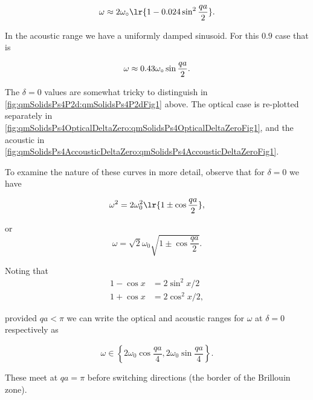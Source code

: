 {\begin{dmath}\label{eqn:condensedMatterProblemSet4Problem2:800}
\omega \approx 
2 \omega_\nought \lr{ 1 - 0.024 \sin^2 \frac{qa}{2} }.
\end{dmath}

In the acoustic  range we have a uniformly damped sinusoid.  For this $0.9$ case that is

\begin{dmath}\label{eqn:condensedMatterProblemSet4Problem2:720}
\omega \approx 0.43 \omega_\nought \sin \frac{qa}{2}.
\end{dmath}


The $\delta = 0$ values are somewhat tricky to distinguish in \cref{fig:qmSolidsPs4P2d:qmSolidsPs4P2dFig1} above.  The optical case is re-plotted separately in \cref{fig:qmSolidsPs4OpticalDeltaZero:qmSolidsPs4OpticalDeltaZeroFig1}, and the acoustic in \cref{fig:qmSolidsPs4AccousticDeltaZero:qmSolidsPs4AccousticDeltaZeroFig1}.


To examine the nature of these curves in more detail, observe that for $\delta = 0$ we have

\begin{dmath}\label{eqn:condensedMatterProblemSet4Problem2:820}
\omega^2 = 2 \omega_0^2 \lr{ 1 \pm \cos \frac{qa}{2} },
\end{dmath}

or
\begin{dmath}\label{eqn:condensedMatterProblemSet4Problem2:840}
\omega = \sqrt{2} \omega_0 \sqrt{ 1 \pm \cos \frac{qa}{2} }.
\end{dmath}

Noting that 
\begin{equation}\label{eqn:condensedMatterProblemSet4Problem2:860}
\begin{aligned}
1 - \cos x &= 2 \sin^2 x/2 \\
1 + \cos x &= 2 \cos^2 x/2,
\end{aligned}
\end{equation}

provided $qa < \pi$ we can write the optical and acoustic ranges for $\omega$ at $\delta = 0$ respectively as

\begin{dmath}\label{eqn:condensedMatterProblemSet4Problem2:880}
\omega \in \left\{ 
2 \omega_0 \cos \frac{qa}{4},
2 \omega_0 \sin \frac{qa}{4}
 \right\}.
\end{dmath}

These meet at $qa = \pi$ before switching directions (the border of the Brillouin zone).
}
